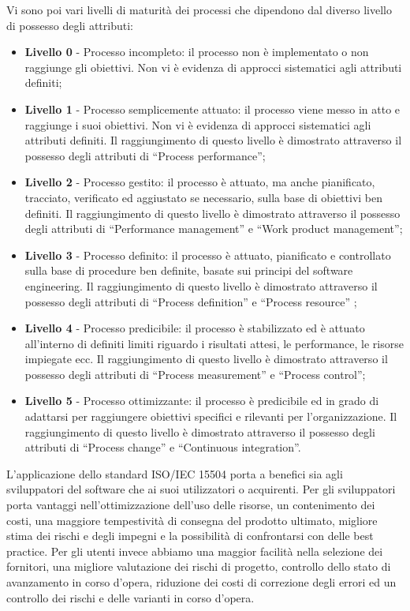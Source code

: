 Vi sono poi vari livelli di maturità dei processi che dipendono dal diverso livello di possesso degli attributi:
\begin{itemize}
\item \textbf{Livello 0} - Processo incompleto: il processo non è implementato o non raggiunge gli obiettivi. Non vi è evidenza di approcci sistematici agli attributi definiti;
\item \textbf{Livello 1} - Processo semplicemente attuato: il processo viene messo in atto e raggiunge i suoi obiettivi. Non vi è evidenza di approcci sistematici agli attributi definiti. Il raggiungimento di questo livello è dimostrato attraverso il possesso degli attributi di “Process performance”;
\item \textbf{Livello 2} - Processo gestito: il processo è attuato, ma anche pianificato, tracciato, verificato ed aggiustato se necessario, sulla base di obiettivi ben definiti. Il raggiungimento di questo livello è dimostrato attraverso il possesso degli attributi di “Performance management” e “Work product management”;
\item \textbf{Livello 3} - Processo definito: il processo è attuato, pianificato e controllato sulla base di procedure ben definite, basate sui principi del software engineering. Il raggiungimento di questo livello è dimostrato attraverso il possesso degli attributi di “Process definition” e “Process resource” ;
\item \textbf{Livello 4} - Processo predicibile: il processo è stabilizzato ed è attuato all’interno di definiti limiti riguardo i risultati attesi, le performance, le risorse impiegate ecc. Il raggiungimento di questo livello è dimostrato attraverso il possesso degli attributi di “Process measurement” e “Process control”;
\item \textbf{Livello 5} - Processo ottimizzante: il processo è predicibile ed in grado di adattarsi per raggiungere obiettivi specifici e rilevanti per l’organizzazione.
Il raggiungimento di questo livello è dimostrato attraverso il possesso degli attributi di “Process change” e “Continuous integration”.
\end{itemize}

L’applicazione dello standard ISO/IEC 15504 porta a benefici sia agli sviluppatori del software che ai suoi utilizzatori o acquirenti. Per gli sviluppatori porta vantaggi nell’ottimizzazione dell’uso delle risorse, un contenimento dei costi, una maggiore tempestività di consegna del prodotto ultimato, migliore stima dei rischi e degli impegni e la possibilità di confrontarsi con delle best practice. 
Per gli utenti invece abbiamo una maggior facilità nella selezione dei fornitori, una migliore valutazione dei rischi di progetto, controllo dello stato di avanzamento in corso d’opera, riduzione dei costi di correzione degli errori ed un controllo dei rischi e delle varianti in corso d’opera.

